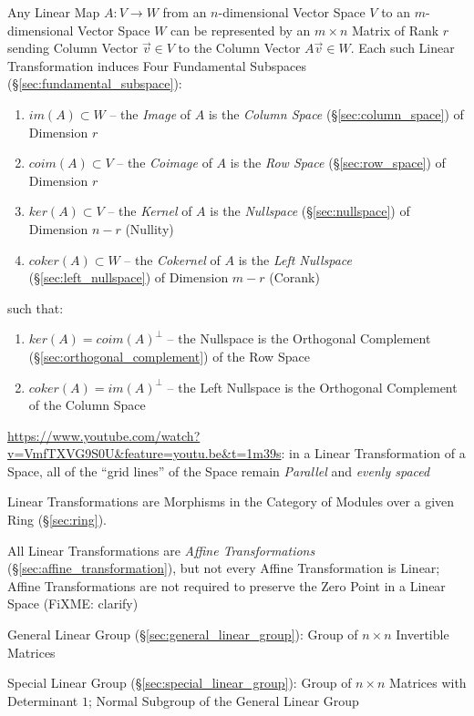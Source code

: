Any Linear Map $A : V \rightarrow W$ from an $n$-dimensional Vector Space $V$
to an $m$-dimensional Vector Space $W$ can be represented by an $m \times n$
Matrix of Rank $r$ sending Column Vector $\vec{v} \in V$ to the Column Vector
$A\vec{v} \in W$. Each such Linear Transformation induces Four Fundamental
Subspaces (\S\ref{sec:fundamental_subspace}):
\begin{enumerate}
  \item $im(A) \subset W$ -- the \emph{Image} of $A$ is the \emph{Column Space}
    (\S\ref{sec:column_space}) of Dimension $r$
  \item $coim(A) \subset V$ -- the \emph{Coimage} of $A$ is the \emph{Row Space}
    (\S\ref{sec:row_space}) of Dimension $r$
  \item $ker(A) \subset V$ -- the \emph{Kernel} of $A$ is the \emph{Nullspace}
    (\S\ref{sec:nullspace}) of Dimension $n - r$ (Nullity) %
  \item $coker(A) \subset W$ -- the \emph{Cokernel} of $A$ is the \emph{Left
    Nullspace} (\S\ref{sec:left_nullspace}) of Dimension $m - r$ (Corank)
\end{enumerate}
such that:
\begin{enumerate}
  \item $ker(A) = coim(A)^\bot$ -- the Nullspace is the Orthogonal Complement
    (\S\ref{sec:orthogonal_complement}) of the Row Space
  \item $coker(A) = im(A)^\bot$ -- the Left Nullspace is the Orthogonal
    Complement of the Column Space
\end{enumerate}

\url{https://www.youtube.com/watch?v=VmfTXVG9S0U&feature=youtu.be&t=1m39s}: in
a Linear Transformation of a Space, all of the ``grid lines'' of the Space
remain \emph{Parallel} and \emph{evenly spaced}

Linear Transformations are Morphisms in the Category of Modules over a given
Ring (\S\ref{sec:ring}).

All Linear Transformations are \emph{Affine Transformations}
(\S\ref{sec:affine_transformation}), but not every Affine Transformation is
Linear; Affine Transformations are not required to preserve the Zero Point in a
Linear Space (FiXME: clarify)

\fist General Linear Group (\S\ref{sec:general_linear_group}): Group of $n
\times n$ Invertible Matrices

\fist Special Linear Group (\S\ref{sec:special_linear_group}): Group of $n
\times n$ Matrices with Determinant $1$; Normal Subgroup of the General Linear
Group

